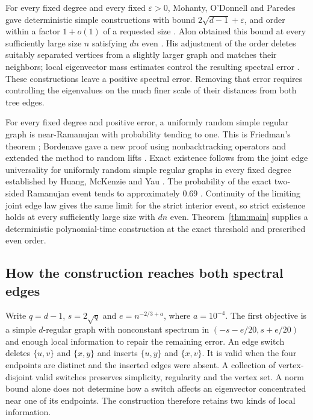 For every fixed degree and every fixed $\varepsilon>0$, Mohanty,
O'Donnell and Paredes gave deterministic simple constructions with
bound $2\sqrt{d-1}+\varepsilon$, and order within a factor $1+o(1)$
of a requested size \cite{MOP2020}. Alon obtained this
bound at every sufficiently large size $n$ satisfying $dn$ even
\cite[Theorem~1.3]{Alon2021}. His adjustment of the order deletes
suitably separated vertices from a slightly larger graph and matches
their neighbors; local eigenvector mass estimates control the resulting
spectral error \cite[Section~3]{Alon2021}.
These constructions leave a positive spectral error.
Removing that error requires controlling the eigenvalues on the
much finer scale of their distances from both tree edges.

For every fixed degree and positive error, a uniformly random simple
regular graph is near-Ramanujan with probability tending to one.
This is Friedman's theorem \cite{Friedman2008}; Bordenave gave a new
proof using nonbacktracking operators and extended the method to random
lifts \cite{Bordenave2020}.
Exact existence follows from the joint edge
universality for uniformly random simple regular graphs in every
fixed degree established by Huang, McKenzie and Yau
\cite[Remarks~3.10 and~3.12]{HMY2024}. The probability of the exact two-sided
Ramanujan event tends to approximately $0.69$
\cite[Corollary~1.3]{HMY2024}. Continuity of the
limiting joint edge law gives the same limit for the strict interior
event, so strict existence holds at every sufficiently large
size with $dn$ even. Theorem~\ref{thm:main} supplies a deterministic
polynomial-time construction at the exact threshold and prescribed
even order.

\subsection{How the construction reaches both spectral edges}

Write $q=d-1$, $s=2\sqrt q$ and $e=n^{-2/3+a}$, where $a=10^{-4}$.
The first objective is a simple $d$-regular graph with nonconstant
spectrum in $(-s-e/20,s+e/20)$ and enough local information to repair
the remaining error. An edge switch deletes $\{u,v\}$ and $\{x,y\}$
and inserts $\{u,y\}$ and $\{x,v\}$. It is valid when the four
endpoints are distinct and the inserted edges were absent.
A collection of vertex-disjoint valid switches preserves simplicity,
regularity and the vertex set. A norm bound alone does not determine how
a switch affects an eigenvector concentrated near one of its endpoints.
The construction therefore retains two kinds of local information.

